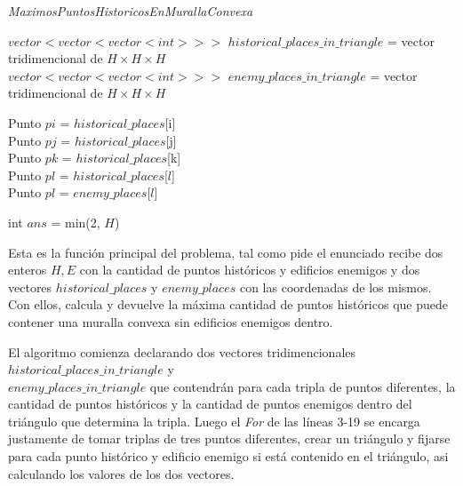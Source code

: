 \begin{algorithm}[H]
	\caption{\textit{MaximosPuntosHistoricosEnMurallaConvexa}}

	$vector<vector<vector<int>>>$ $historical\_places\_in\_triangle$ = vector tridimencional de $H \times H \times H$ \\
	$vector<vector<vector<int>>>$ $enemy\_places\_in\_triangle$ = vector tridimencional de $H \times H \times H$

	 {
        Punto $pi$ = $historical\_places$[i] \\
        Punto $pj$ = $historical\_places$[j] \\
        Punto $pk$ = $historical\_places$[k] \\
         {
            Punto $pl$ = $historical\_places$[$l$] \\
        }
         {
            Punto $pl$ = $enemy\_places$[$l$] \\
        }
    }

	int $ans$ = min(2, $H$) \\

\end{algorithm}

Esta es la función principal del problema, tal como pide el enunciado recibe dos enteros $H,E$ con la cantidad
de puntos históricos y edificios enemigos y dos vectores $historical\_places$ y $enemy\_places$ con las coordenadas
de los mismos.
Con ellos, calcula y devuelve la máxima cantidad de puntos históricos que puede contener una
muralla convexa sin edificios enemigos dentro.

El algoritmo comienza declarando dos vectores tridimencionales $historical\_places\_in\_triangle$ y \\
$enemy\_places\_in\_triangle$ que contendrán para cada tripla de puntos diferentes, la cantidad de puntos históricos
y la cantidad de puntos enemigos dentro del triángulo que determina la tripla.
Luego el \textit{For} de las líneas 3-19 se encarga justamente de tomar triplas de tres puntos diferentes,
crear un triángulo y fijarse para cada punto histórico y edificio enemigo si está contenido en el triángulo, asi
calculando los valores de los dos vectores.


